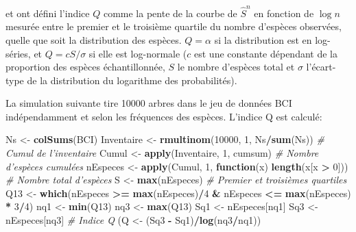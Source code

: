 \documentclass[
  11pt,
  french,
  a4paper,
  extrafontsizes,onecolumn,openright
  ]{memoir}
\newenvironment{Shaded}{\begin{snugshade}}{\end{snugshade}}
\newcommand{\CommentTok}[1]{\textcolor[rgb]{0.56,0.35,0.01}{\textit{#1}}}
\newcommand{\ControlFlowTok}[1]{\textcolor[rgb]{0.13,0.29,0.53}{\textbf{#1}}}
\newcommand{\DecValTok}[1]{\textcolor[rgb]{0.00,0.00,0.81}{#1}}
\newcommand{\KeywordTok}[1]{\textcolor[rgb]{0.13,0.29,0.53}{\textbf{#1}}}
\newcommand{\NormalTok}[1]{#1}
\newcommand{\OperatorTok}[1]{\textcolor[rgb]{0.81,0.36,0.00}{\textbf{#1}}}
\newcommand{\StringTok}[1]{\textcolor[rgb]{0.31,0.60,0.02}{#1}}
\begin{document}
\textcite{Kempton1976} et \textcite{Kempton1978} ont défini l'indice \(Q\) comme la pente de la courbe de \(\hat{S}^{n}\) en fonction de \(\log{n}\) mesurée entre le premier et le troisième quartile du nombre d'espèces observées, quelle que soit la distribution des espèces.
\(Q = \alpha\) si la distribution est en log-séries, et \(Q = {c S}/{\sigma}\) si elle est log-normale (\(c\) est une constante dépendant de la proportion des espèces échantillonnée, \(S\) le nombre d'espèces total et \(\sigma\) l'écart-type de la distribution du logarithme des probabilités).

La simulation suivante tire 10000 arbres dans le jeu de données BCI indépendamment et selon les fréquences des espèces.
L'indice Q est calculé:

\scriptsize

\begin{Shaded}
\begin{Highlighting}[]
\NormalTok{Ns <-}\StringTok{ }\KeywordTok{colSums}\NormalTok{(BCI)}
\NormalTok{Inventaire <-}\StringTok{ }\KeywordTok{rmultinom}\NormalTok{(}\DecValTok{10000}\NormalTok{, }\DecValTok{1}\NormalTok{, Ns}\OperatorTok{/}\KeywordTok{sum}\NormalTok{(Ns))}
\CommentTok{# Cumul de l'inventaire}
\NormalTok{Cumul <-}\StringTok{ }\KeywordTok{apply}\NormalTok{(Inventaire, }\DecValTok{1}\NormalTok{, cumsum)}
\CommentTok{# Nombre d'espèces cumulées}
\NormalTok{nEspeces <-}\StringTok{ }\KeywordTok{apply}\NormalTok{(Cumul, }\DecValTok{1}\NormalTok{, }\ControlFlowTok{function}\NormalTok{(x) }\KeywordTok{length}\NormalTok{(x[x }\OperatorTok{>}\StringTok{ }\DecValTok{0}\NormalTok{]))}
\CommentTok{# Nombre total d'espèces}
\NormalTok{S <-}\StringTok{ }\KeywordTok{max}\NormalTok{(nEspeces)}
\CommentTok{# Premier et troisièmes quartiles}
\NormalTok{Q13 <-}\StringTok{ }\KeywordTok{which}\NormalTok{(nEspeces }\OperatorTok{>=}\StringTok{ }\KeywordTok{max}\NormalTok{(nEspeces)}\OperatorTok{/}\DecValTok{4} \OperatorTok{&}\StringTok{ }\NormalTok{nEspeces }\OperatorTok{<=}\StringTok{ }\KeywordTok{max}\NormalTok{(nEspeces) }\OperatorTok{*}\StringTok{ }
\StringTok{    }\DecValTok{3}\OperatorTok{/}\DecValTok{4}\NormalTok{)}
\NormalTok{nq1 <-}\StringTok{ }\KeywordTok{min}\NormalTok{(Q13)}
\NormalTok{nq3 <-}\StringTok{ }\KeywordTok{max}\NormalTok{(Q13)}
\NormalTok{Sq1 <-}\StringTok{ }\NormalTok{nEspeces[nq1]}
\NormalTok{Sq3 <-}\StringTok{ }\NormalTok{nEspeces[nq3]}
\CommentTok{# Indice Q}
\NormalTok{(Q <-}\StringTok{ }\NormalTok{(Sq3 }\OperatorTok{-}\StringTok{ }\NormalTok{Sq1)}\OperatorTok{/}\KeywordTok{log}\NormalTok{(nq3}\OperatorTok{/}\NormalTok{nq1))}
\end{Highlighting}
\end{Shaded}
\end{document}
